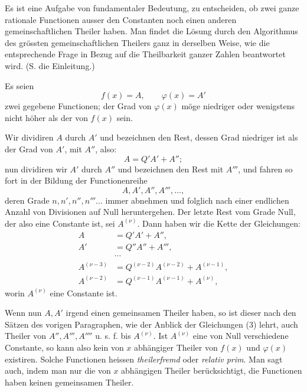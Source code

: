 \documentclass[11pt]{article}
\begin{document}
Es ist eine Aufgabe von fundamentaler Bedeutung, zu entscheiden, ob zwei ganze rationale Functionen ausser den Constanten noch einen anderen gemeinschaftlichen Theiler haben. Man findet die Lösung durch den Algorithmus des grössten gemeinschaftlichen Theilers ganz in derselben Weise, wie die entsprechende Frage in Bezug auf die Theilbarkeit ganzer Zahlen beantwortet wird. (S. die Einleitung.)

Es seien
\begin{equation}
 f(x)=A,\qquad \varphi(x)=A'
\tag{1}
\end{equation}
zwei gegebene Functionen; der Grad von $\varphi(x)$ möge niedriger oder wenigstens nicht höher als der von $f(x)$ sein.

Wir dividiren $A$ durch $A'$ und bezeichnen den Rest, dessen Grad niedriger ist als der Grad von $A'$, mit $A''$, also:
\[
 A=Q'A'+A'';
\]
nun dividiren wir $A'$ durch $A''$ und bezeichnen den Rest mit $A'''$, und fahren so fort in der Bildung der Functionenreihe
\begin{equation}
 A,A',A'',A''',\ldots,
\tag{2}
\end{equation}
deren Grade $n,n',n'',n'''\ldots$ immer abnehmen und folglich nach einer endlichen Anzahl von Divisionen auf Null heruntergehen. Der letzte Rest vom Grade Null, der also eine Constante ist, sei $A^{(\nu)}$. Dann haben wir die Kette der Gleichungen:
\begin{equation}
\begin{aligned}
A&=Q'A'+A'',\\
A'&=Q''A''+A''',\\
&\cdots\\
A^{(\nu-3)}&=Q^{(\nu-2)}A^{(\nu-2)}+A^{(\nu-1)},\\
A^{(\nu-2)}&=Q^{(\nu-1)}A^{(\nu-1)}+A^{(\nu)},
\end{aligned}
\tag{3}
\end{equation}
worin $A^{(\nu)}$ eine Constante ist.

Wenn nun $A,A'$ irgend einen gemeinsamen Theiler haben, so ist dieser nach den Sätzen des vorigen Paragraphen, wie der Anblick der Gleichungen (3) lehrt, auch Theiler von $A'',A''',A''''$ u. s. f. bis $A^{(\nu)}$. Ist $A^{(\nu)}$ eine von Null verschiedene Constante, so kann also kein von $x$ abhängiger Theiler von $f(x)$ und $\varphi(x)$ existiren. Solche Functionen heissen \emph{theilerfremd} oder \emph{relativ prim}. Man sagt auch, indem man nur die von $x$ abhängigen Theiler berücksichtigt, die Functionen haben keinen gemeinsamen Theiler.
\end{document}

